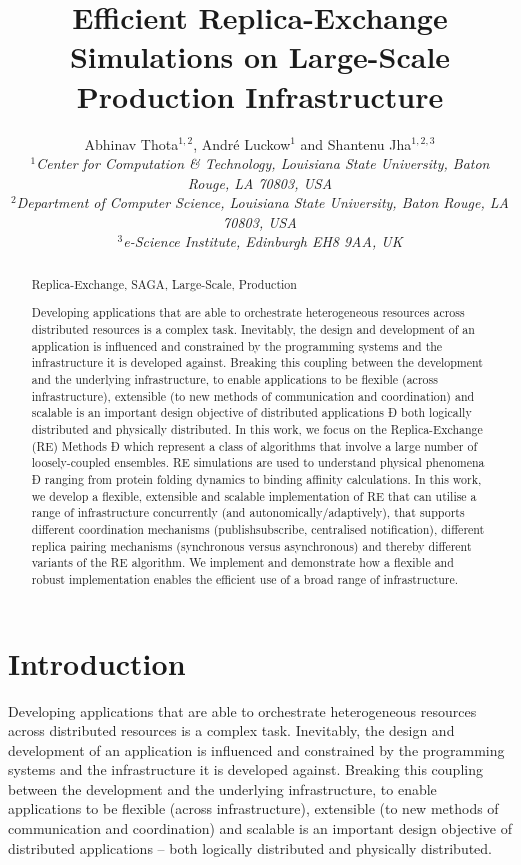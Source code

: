 \documentclass{rspublic}
\title[Efficient Replica-Exchange Simulations on
  Large-Scale Production Infrastructure]{Efficient Replica-Exchange Simulations on
  Large-Scale Production Infrastructure}
\author[Thota, Luckow, Jha]{
  Abhinav Thota$^{1,2}$, Andr\'e Luckow$^{1}$ and Shantenu Jha$^{1,2,3}$\\
  \small{\emph{$^{1}$Center for Computation \& Technology, Louisiana State University, Baton Rouge, LA 70803, USA}}\\
  \small{\emph{$^{2}$Department of Computer Science, Louisiana State
      University, Baton Rouge, LA 70803, USA}}\\
  \small{\emph{$^{3}$e-Science Institute, Edinburgh EH8 9AA, UK}}\\
}
\begin{document}
 


\maketitle    

\begin{abstract}{Replica-Exchange, SAGA, Large-Scale, Production}  

Developing applications that are able to orchestrate heterogeneous resources across distributed resources is a complex
task. Inevitably, the design and development of an application is influenced and constrained by the programming systems
and the infrastructure it is developed against. Breaking this coupling between the development and the underlying
infrastructure, to enable applications to be flexible (across infrastructure), extensible (to new methods of communication
and coordination) and scalable is an important design objective of distributed applications Ð both logically
distributed and physically distributed.
In this work, we focus on the Replica-Exchange (RE) Methods Ð which represent a class of algorithms that
involve a large number of loosely-coupled ensembles. RE simulations are used to understand physical phenomena Ð
ranging from protein folding dynamics to binding affinity calculations.
In this work, we develop a flexible, extensible and scalable implementation of RE that can utilise a range of infrastructure
concurrently (and autonomically/adaptively), that supports different coordination mechanisms (publishsubscribe,
centralised notification), different replica pairing mechanisms (synchronous versus asynchronous) and
thereby different variants of the RE algorithm. We implement and demonstrate how a flexible and robust implementation
enables the efficient use of a broad range of infrastructure.
\end{abstract}

\section{Introduction}
Developing applications that are able to orchestrate heterogeneous
resources across distributed resources is a complex task.  Inevitably,
the design and development of an application is influenced and
constrained by the programming systems and the infrastructure it is
developed against. Breaking this coupling between the development and
the underlying infrastructure, to enable applications to be flexible
(across infrastructure), extensible (to new methods of communication
and coordination) and scalable is an important design objective of
distributed applications -- both logically distributed and physically
distributed.
\end{document}
